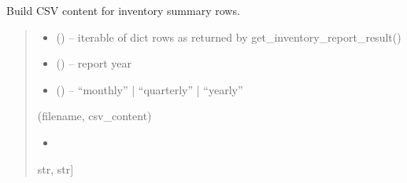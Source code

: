 \documentclass[a4paper,11pt,spanish]{sphinxmanual}
\begin{document}
\begin{fulllineitems}
\label{\detokenize{api/reports/reports.services:reports.services.build_inventory_csv}}
\pysigstartsignatures
\pysiglinewithargsret
{}
{\sphinxparamcomma {}\sphinxparamcomma {}}
{}
\pysigstopsignatures
\sphinxAtStartPar
Build CSV content for inventory summary rows.
\begin{quote}\begin{description}
\begin{itemize}
\item {} 
\sphinxAtStartPar
{} (\sphinxstyleliteralemphasis{\sphinxupquote{{[}}}\sphinxstyleliteralemphasis{\sphinxupquote{{[}}}\sphinxstyleliteralemphasis{\sphinxupquote{, }}\sphinxstyleliteralemphasis{\sphinxupquote{{]}}}\sphinxstyleliteralemphasis{\sphinxupquote{{]}}}) – iterable of dict rows as returned by get\_inventory\_report\_result()

\item {} 
\sphinxAtStartPar
{} () – report year

\item {} 
\sphinxAtStartPar
{} () – “monthly” | “quarterly” | “yearly”

\end{itemize}

\sphinxAtStartPar
(filename, csv\_content)

\begin{itemize}
\item {} 
\end{itemize}

\sphinxAtStartPar
\sphinxstyleemphasis{Tuple}{[}str, str{]}

\end{description}\end{quote}

\end{fulllineitems}
\end{document}
